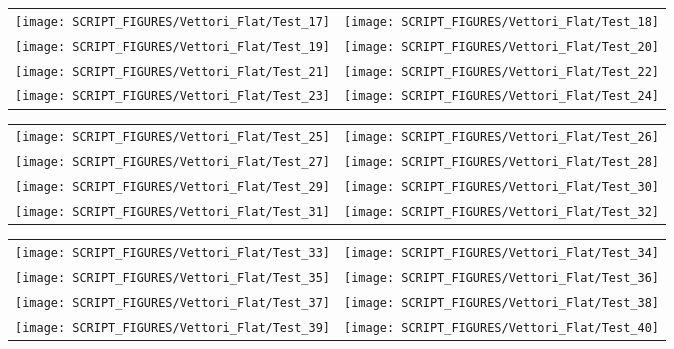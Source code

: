 \begin{figure}[p]
\begin{tabular*}{\textwidth}{l@{\extracolsep{\fill}}r}
\texttt{[image: SCRIPT\_FIGURES/Vettori\_Flat/Test\_17]} &
\texttt{[image: SCRIPT\_FIGURES/Vettori\_Flat/Test\_18]} \\
\texttt{[image: SCRIPT\_FIGURES/Vettori\_Flat/Test\_19]} &
\texttt{[image: SCRIPT\_FIGURES/Vettori\_Flat/Test\_20]} \\
\texttt{[image: SCRIPT\_FIGURES/Vettori\_Flat/Test\_21]} &
\texttt{[image: SCRIPT\_FIGURES/Vettori\_Flat/Test\_22]} \\
\texttt{[image: SCRIPT\_FIGURES/Vettori\_Flat/Test\_23]} &
\texttt{[image: SCRIPT\_FIGURES/Vettori\_Flat/Test\_24]} \\
\end{tabular*}
\label{Vettori_3}
\end{figure}

\begin{figure}[p]
\begin{tabular*}{\textwidth}{l@{\extracolsep{\fill}}r}
\texttt{[image: SCRIPT\_FIGURES/Vettori\_Flat/Test\_25]} &
\texttt{[image: SCRIPT\_FIGURES/Vettori\_Flat/Test\_26]} \\
\texttt{[image: SCRIPT\_FIGURES/Vettori\_Flat/Test\_27]} &
\texttt{[image: SCRIPT\_FIGURES/Vettori\_Flat/Test\_28]} \\
\texttt{[image: SCRIPT\_FIGURES/Vettori\_Flat/Test\_29]} &
\texttt{[image: SCRIPT\_FIGURES/Vettori\_Flat/Test\_30]} \\
\texttt{[image: SCRIPT\_FIGURES/Vettori\_Flat/Test\_31]} &
\texttt{[image: SCRIPT\_FIGURES/Vettori\_Flat/Test\_32]} \\
\end{tabular*}
\label{Vettori_4}
\end{figure}

\begin{figure}[p]
\begin{tabular*}{\textwidth}{l@{\extracolsep{\fill}}r}
\texttt{[image: SCRIPT\_FIGURES/Vettori\_Flat/Test\_33]} &
\texttt{[image: SCRIPT\_FIGURES/Vettori\_Flat/Test\_34]} \\
\texttt{[image: SCRIPT\_FIGURES/Vettori\_Flat/Test\_35]} &
\texttt{[image: SCRIPT\_FIGURES/Vettori\_Flat/Test\_36]} \\
\texttt{[image: SCRIPT\_FIGURES/Vettori\_Flat/Test\_37]} &
\texttt{[image: SCRIPT\_FIGURES/Vettori\_Flat/Test\_38]} \\
\texttt{[image: SCRIPT\_FIGURES/Vettori\_Flat/Test\_39]} &
\texttt{[image: SCRIPT\_FIGURES/Vettori\_Flat/Test\_40]} \\
\end{tabular*}
\label{Vettori_5}
\end{figure}


